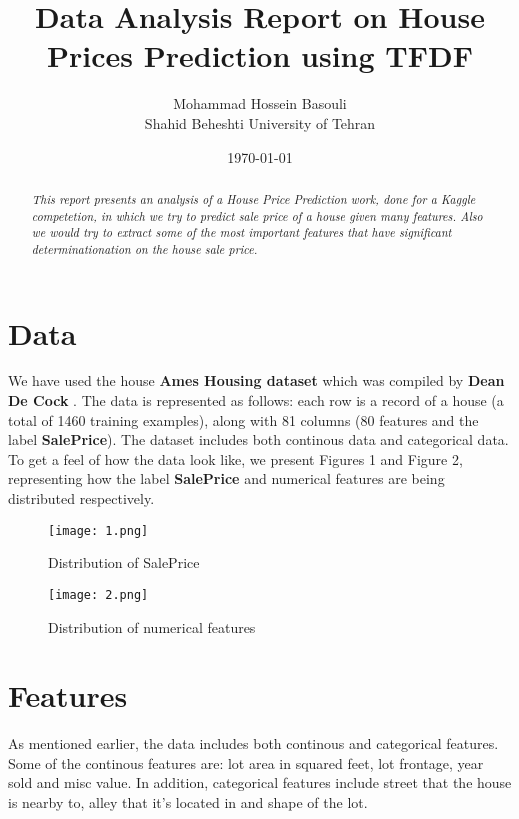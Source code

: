 \documentclass[a4paper,12pt]{article}
\title{Data Analysis Report on House Prices Prediction using TFDF}
\author{Mohammad Hossein Basouli \\ Shahid Beheshti University of Tehran}
\date{\today}
\begin{document}
\maketitle

\begin{abstract}
    \textit{This report presents an analysis of a House Price Prediction work, done for a Kaggle competetion, in which we try to predict sale price of a house given many features. Also we would try to extract some of the most important features that have significant determinationation on the house sale price.}
\end{abstract}

\section{Data}
We have used the house \textbf{Ames Housing dataset} which was compiled by \textbf{Dean De Cock} \cite{ameshousingdataset2023}.
The data is represented as follows: each row is a record of a house (a total of 1460 training examples), along with 81 columns (80 features and the label \textbf{SalePrice}). The dataset includes both continous data and categorical data.
To get a feel of how the data look like, we present Figures 1 and Figure 2, representing how the label \textbf{SalePrice} and numerical features are being distributed respectively.

\begin{figure}[h] %
    \centering
    \texttt{[image: 1.png]} %
    \caption{Distribution of SalePrice}
\end{figure}

\begin{figure}[] %
    \centering
    \texttt{[image: 2.png]} %
    \caption{Distribution of numerical features}
\end{figure}

\section{Features}
As mentioned earlier, the data includes both continous and categorical features. Some of the continous features are: lot area in squared feet, lot frontage, year sold and misc value. In addition, categorical features include street that the house is nearby to, alley that it's located in and shape of the lot.   
\end{document}
